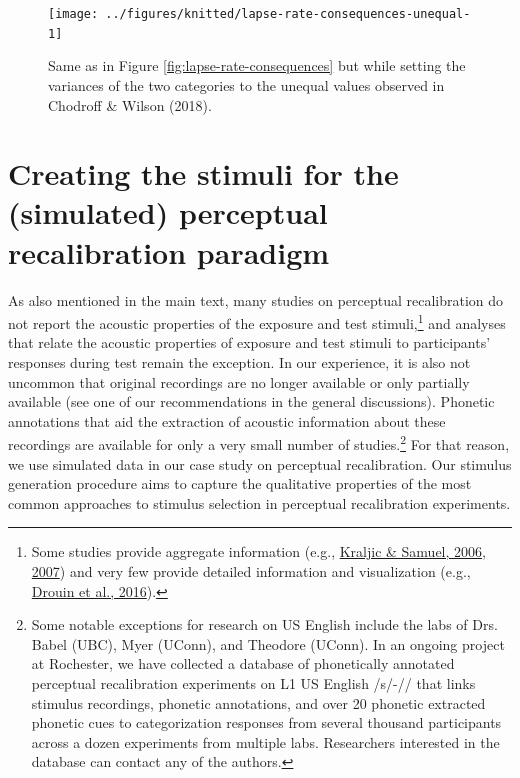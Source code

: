 \documentclass[
  11pt,
  english,
  man,floatsintext]{apa6}
\begin{document}
\begin{figure}

{\centering \texttt{[image: ../figures/knitted/lapse-rate-consequences-unequal-1]} 

}

\caption{Same as in Figure \ref{fig:lapse-rate-consequences} but while setting the variances of the two categories to the unequal values observed in Chodroff \& Wilson (2018).}\label{fig:lapse-rate-consequences-unequal}
\end{figure}

\hypertarget{sec:SI-PR}{%
\section{Creating the stimuli for the (simulated) perceptual recalibration paradigm}\label{sec:SI-PR}}

As also mentioned in the main text, many studies on perceptual recalibration do not report the acoustic properties of the exposure and test stimuli,\footnote{Some studies provide aggregate information (e.g., \protect\hyperlink{ref-kraljic-samuel2006}{Kraljic \& Samuel, 2006}, \protect\hyperlink{ref-kraljic-samuel2007}{2007}) and very few provide detailed information and visualization (e.g., \protect\hyperlink{ref-drouin2016}{Drouin et al., 2016}).} and analyses that relate the acoustic properties of exposure and test stimuli to participants' responses during test remain the exception. In our experience, it is also not uncommon that original recordings are no longer available or only partially available (see one of our recommendations in the general discussions). Phonetic annotations that aid the extraction of acoustic information about these recordings are available for only a very small number of studies.\footnote{Some notable exceptions for research on US English include the labs of Drs. Babel (UBC), Myer (UConn), and Theodore (UConn). In an ongoing project at Rochester, we have collected a database of phonetically annotated perceptual recalibration experiments on L1 US English /s/-// that links stimulus recordings, phonetic annotations, and over 20 phonetic extracted phonetic cues to categorization responses from several thousand participants across a dozen experiments from multiple labs. Researchers interested in the database can contact any of the authors.} For that reason, we use simulated data in our case study on perceptual recalibration. Our stimulus generation procedure aims to capture the qualitative properties of the most common approaches to stimulus selection in perceptual recalibration experiments.
\end{document}
